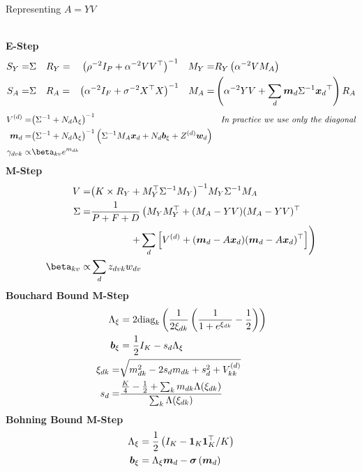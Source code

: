 \begin{algorithm}
\caption{Representing $A=YV$}
\label{alg:yv}
$\text{ }$\\
{\bf E-Step}
    \begin{align*}
        S_Y = & \Sigma \quad R_Y = & {\left( \rho^{-2} I_P + \alpha^{-2}V V ^\top \right)}^{-1}
        \quad M_Y = & R_Y \left( \alpha^{-2} V M_A \right) \\
        S_A = & \Sigma \quad R_A = & {\left( \alpha^{-2} I_F + \sigma^{-2} X^\top X \right)}^{-1} 
        \quad M_A = & \left(\alpha^{-2} YV + \sum_d \bm m_d {\Sigma}^{-1} { \bm x_d }^\top\right)R_A
    \end{align*}
    \begin{align*}
         \Vd = & \invb{\inv{\Sigma} + N_d \Axi} & \text{\emph{In practice we use only the diagonal}}\\
         \md = & \invb{\inv{\Sigma} + N_d \Axi} \left(\inv{\Sigma} M_A \xd  + N_d \bxi + Z^{(d)}\vv{w}_d \right )\\
        \gamma_{dvk} \propto & \beta_{kv} e^{m_{dk}} 
\end{align*}
{\bf M-Step}
\begin{align*}
    V = & \invb{K \times R_Y + M_Y\T \inv{\Sigma} M_Y}M_Y \inv{\Sigma} M_A \\
    \Sigma = & \frac{1}{P+F+D} \left(M_Y M_Y\T + (M_A - Y V)(M_A - Y V)\T \right. \\
        & \qquad \qquad \left. + \sum_d \left[ \Vd + (\md - A \xd)(\md - A\xd)\T \right] \right)\\
     \beta_{kv} \propto & \sum_d z_{dvk} w_{dv} 
\end{align*}
{\bf Bouchard Bound M-Step}
    \begin{align*}
        { \Lambda_{\xi} } & = 2 \text{diag}_k
    \left(
        \frac{1}{2{\xi_{dk}}}\left(\frac{1}{1 + e^{{\xi_{dk}}}} - \frac{1}{2}\right)
    \right) \\
{ \bm b_{\xi} } & = \frac{1}{2} I_K - s_d { \Lambda_{\xi} } \\
        {\xi_{dk}} = & \sqrt{m_{dk}^2 - 2s_d m_{dk} + s_d^2 + V^{(d)}_{kk}} \\
        s_d = & \frac{\frac{K}{4} - \frac{1}{2} + \sum_k m_{dk} {\Lambda(\xi_{dk})}}{\sum_k {\Lambda(\xi_{dk})}} \\
    \end{align*}
{\bf Bohning Bound M-Step}
    \begin{align*}
        { \Lambda_{\xi} } & = \frac{1}{2} \left(I_K - \mathbf{1}_K\mathbf{1}_K^\top / K  \right) \\
        { \bm b_{\xi} } & = { \Lambda_{\xi} } \bm m_d  - { \bm \sigma\left( \bm m_d \right) }
    \end{align*}
\end{algorithm}

